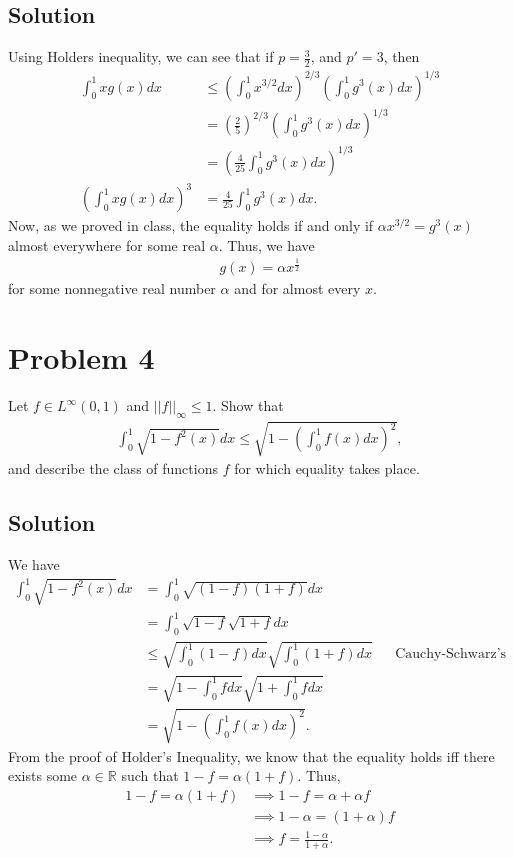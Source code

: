\documentclass[10pt,a4paper]{article}
\theoremstyle{theorem}
\theoremstyle{definition}
\begin{document}
\subsection*{Solution}
Using Holders inequality, we can see that if $p = \frac{3}{2}$, and $p' = 3$, then
\begin{align*}
\int_0^1 x g(x)dx &\leq \left(\int_0^1 x^{3/2} dx \right)^{2/3} \left(\int_0^1  g^3(x)dx \right)^{1/3}\\
&= \left( \frac{2}{5} \right)^{2/3} \left(\int_0^1  g^3(x)dx \right)^{1/3}\\
&= \left( \frac{4}{25} \int_0^1  g^3(x)dx \right)^{1/3}\\
\left( \int_0^1 x g(x)dx \right)^3 &= \frac{4}{25} \int_0^1 g^3(x)dx.
\end{align*}
Now, as we proved in class, the equality holds if and only if $\alpha x^{3/2} = g^3(x)$ almost everywhere for some real $\alpha$. Thus, we have
\begin{align*}
g(x) = \alpha x^\frac{1}{2}
\end{align*}
for some nonnegative real number $\alpha$ and for almost every $x$.

\section*{Problem 4}
Let $f \in L^\infty (0, 1)$ and $||f||_\infty \leq 1$. Show that 
\begin{align*}
\int_0^1 \sqrt{1 - f^2(x)} dx \leq \sqrt{1 - \left( \int_0^1 f(x)dx \right)^2},
\end{align*}
and describe the class of functions $f$ for which equality takes place.

\subsection*{Solution}
We have
\begin{align*}
\int_0^1 \sqrt{1 - f^2(x)} dx &= \int_0^1 \sqrt{(1 - f)(1 + f)} dx\\
&= \int_0^1 \sqrt{1 - f} \sqrt{1 + f} dx\\
&\leq \sqrt{\int_0^1 (1 - f) dx}\sqrt{\int_0^1 (1 + f) dx} && \text{Cauchy-Schwarz's inequality}\\
&= \sqrt{1 - \int_0^1 f dx}\sqrt{1 + \int_0^1 f dx}\\
&= \sqrt{1 - \left( \int_0^1 f(x)dx \right)^2}.
\end{align*}
From the proof of Holder's Inequality, we know that the equality holds iff there exists some $\alpha \in \mathbb{R}$ such that $1 - f = \alpha(1 + f)$. Thus, 
\begin{align*}
1 - f = \alpha(1 + f) &\implies 1 - f = \alpha + \alpha f\\
&\implies 1 - \alpha = (1 + \alpha)f\\
&\implies f = \frac{1 - \alpha}{1 + \alpha}.
\end{align*}
\end{document}
